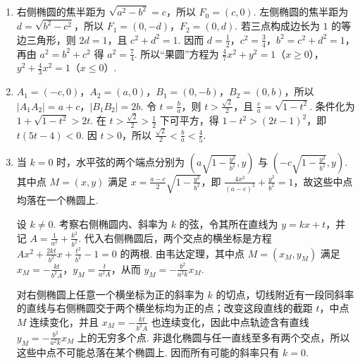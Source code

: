 \begin{solution}
\begin{enumerate}
\item 右侧椭圆的焦半距为 \(\sqrt{a^2-b^2}=c\)，所以 \(F_0=(c,0)\). 左侧椭圆的焦半距为 \(d=\sqrt{b^2-c^2}\)，所以 \(F_1=(0,-d)\)，\(F_2=(0,d)\). 若三点构成边长为 \(1\) 的等边三角形，则 \(2d=1\)，且 \(c^2+d^2=1\). 因而 \(d=\frac12\)，\(c^2=\frac34\)，\(b^2=c^2+d^2=1\)，再由 \(a^2=b^2+c^2\) 得 \(a^2=\frac74\). 所以“果圆”方程为 \(\frac47x^2+y^2=1\)（\(x\geqslant0\)），\(y^2+\frac43x^2=1\)（\(x\leqslant0\)）.
\item \(A_1=(-c,0)\)，\(A_2=(a,0)\)，\(B_1=(0,-b)\)，\(B_2=(0,b)\)，所以 \(\lvert A_1A_2\rvert=a+c\)，\(\lvert B_1B_2\rvert=2b\). 令 \(t=\frac ba\)，则 \(t>\frac{\sqrt2}{2}\)，且 \(\frac ca=\sqrt{1-t^2}\). 条件化为 \(1+\sqrt{1-t^2}>2t\). 在 \(t>\frac{\sqrt2}{2}>\frac12\) 下可平方，得 \(1-t^2>(2t-1)^2\)，即 \(t(5t-4)<0\). 因 \(t>0\)，所以 \(\frac{\sqrt2}{2}<\frac ba<\frac45\).
\item 当 \(k=0\) 时，水平弦的两个端点分别为 \(\left(a\sqrt{1-\frac{y^2}{b^2}},y\right)\) 与 \(\left(-c\sqrt{1-\frac{y^2}{b^2}},y\right)\). 其中点 \(M=(x,y)\) 满足 \(x=\frac{a-c}{2}\sqrt{1-\frac{y^2}{b^2}}\)，即 \(\frac{4x^2}{(a-c)^2}+\frac{y^2}{b^2}=1\)，故这些中点均落在一个椭圆上.

设 \(k\ne0\). 考察右侧椭圆内、斜率为 \(k\) 的弦，令其所在直线为 \(y=kx+t\)，并记 \(A=\frac1{a^2}+\frac{k^2}{b^2}\). 代入右侧椭圆后，两个交点的横坐标是方程 \(Ax^2+\frac{2kt}{b^2}x+\frac{t^2}{b^2}-1=0\) 的两根. 由韦达定理，其中点 \(M=(x_M,y_M)\) 满足 \(x_M=-\frac{kt}{b^2A}\)，\(y_M=\frac{t}{a^2A}\)，从而 \(y_M=-\frac{b^2}{a^2k}x_M\).

对右侧椭圆上任意一个横坐标为正的斜率为 \(k\) 的切点，切线附近有一段同斜率的直线与右侧椭圆交于两个横坐标均为正的点；改变这段直线的截距 \(t\)，中点 \(M\) 连续变化，并且 \(x_M=-\frac{kt}{b^2A}\) 也连续变化，因此中点轨迹含有直线 \(y_M=-\frac{b^2}{a^2k}x_M\) 上的无穷多个点. 非退化椭圆与任一直线至多有两个交点，所以这些中点不可能总落在某个椭圆上. 因而所有可能的斜率只有 \(k=0\).
\end{enumerate}
\end{solution}
